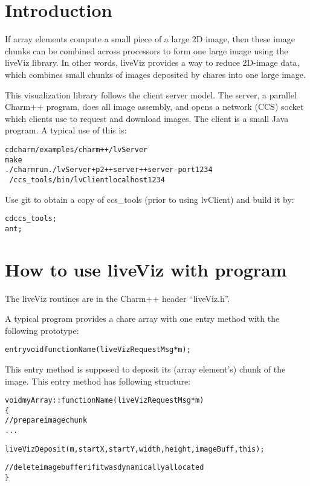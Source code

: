 \section{Introduction}

If array elements compute a small piece of a large 2D image, then these 
image chunks can be combined across processors to form one large 
image using the liveViz library. In other 
words, liveViz provides a way to reduce 2D-image data, which 
combines small chunks of images deposited by chares into one large image.

This visualization library follows the client server model.
The server, a parallel Charm++ program, does all image assembly, 
and opens a network (CCS) socket which clients use to request and 
download images.  The client is a small Java program.
A typical use of this is:
\begin{alltt}
	cd charm/examples/charm++/lvServer
	make
	./charmrun ./lvServer +p2 ++server ++server-port 1234 
	~/ccs_tools/bin/lvClient localhost 1234
\end{alltt}

Use git to obtain a copy of ccs_tools (prior to using lvClient)
 and build it by:

\begin{alltt}
      cd ccs_tools;
      ant;
\end{alltt}



\section{How to use liveViz with \charmpp{} program}

The liveViz routines are in the Charm++ header ``liveViz.h''.

A typical program provides a chare array with one entry method 
with the following prototype:

\begin{alltt}
  entry void functionName(liveVizRequestMsg *m);
\end{alltt}

This entry method is supposed to deposit its (array element's) chunk of 
the image. This entry method has following structure:

\begin{alltt}
  void myArray::functionName (liveVizRequestMsg *m)
  \{
    // prepare image chunk
       ...

    liveVizDeposit (m, startX, startY, width, height, imageBuff, this);

    // delete image buffer if it was dynamically allocated
  \}
\end{alltt}

